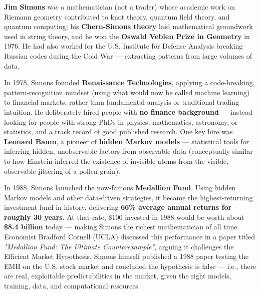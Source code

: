 \documentclass[12pt,openany]{book}
\theoremstyle{definition}
\theoremstyle{remark}
\begin{document}
\textbf{Jim Simons} was a mathematician (not a trader) whose academic work on Riemann geometry contributed to knot theory, quantum field theory, and quantum computing; his \textbf{Chern-Simons theory} laid mathematical groundwork used in string theory, and he won the \textbf{Oswald Veblen Prize in Geometry} in 1976. He had also worked for the U.S. Institute for Defense Analysis breaking Russian codes during the Cold War --- extracting patterns from large volumes of data.

In 1978, Simons founded \textbf{Renaissance Technologies}, applying a code-breaking, pattern-recognition mindset (using what would now be called machine learning) to financial markets, rather than fundamental analysis or traditional trading intuition. He deliberately hired people with \textbf{no finance background} --- instead looking for people with strong PhDs in physics, mathematics, astronomy, or statistics, and a track record of good published research. One key hire was \textbf{Leonard Baum}, a pioneer of \textbf{hidden Markov models} --- statistical tools for inferring hidden, unobservable factors from observable data (conceptually similar to how Einstein inferred the existence of invisible atoms from the visible, observable jittering of a pollen grain).

In 1988, Simons launched the now-famous \textbf{Medallion Fund}. Using hidden Markov models and other data-driven strategies, it became the highest-returning investment fund in history, delivering \textbf{66\% average annual returns for roughly 30 years}. At that rate, \$100 invested in 1988 would be worth about \textbf{\$8.4 billion} today --- making Simons the richest mathematician of all time. Economist Bradford Cornell (UCLA) discussed this performance in a paper titled \emph{"Medallion Fund: The Ultimate Counterexample"}, arguing it challenges the Efficient Market Hypothesis. Simons himself published a 1988 paper testing the EMH on the U.S. stock market and concluded the hypothesis is false --- i.e., there are real, exploitable predictabilities in the market, given the right models, training, data, and computational resources.
\end{document}
